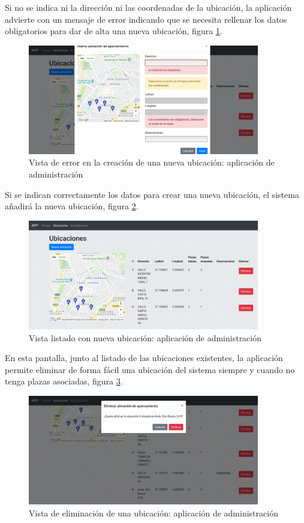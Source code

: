 Si no se indica ni la dirección ni las coordenadas de la ubicación, la aplicación advierte con un mensaje de error indicando que se necesita rellenar los datos obligatorios para dar de alta una nueva ubicación, figura \ref{administracion_ubicacion_nueva_error}.
\begin{figure}[H]
	\centering
	\includegraphics[width=0.9\textwidth]{imagenes/administracion/ubicaciones_nueva_error.png}
	\caption{Vista de error en la creación de una nueva ubicación: aplicación de administración}
	\label{administracion_ubicacion_nueva_error}
\end{figure}
Si se indican correctamente los datos para crear una nueva ubicación, el sistema añadirá la nueva ubicación, figura \ref{administracion_ubicaciones_creada}.
\begin{figure}[H]
	\centering
	\includegraphics[width=0.9\textwidth]{imagenes/administracion/ubicaciones_creada.png}
	\caption{Vista listado con nueva ubicación: aplicación de administración}
	\label{administracion_ubicaciones_creada}
\end{figure}
En esta pantalla, junto al listado de las ubicaciones existentes, la aplicación permite eliminar de forma fácil una ubicación del sistema siempre y cuando no tenga plazas asociadas, figura \ref{administracion_ubicaciones_eliminar}.
\begin{figure}[H]
	\centering
	\includegraphics[width=0.9\textwidth]{imagenes/administracion/ubicaciones_eliminar.png}
	\caption{Vista de eliminación de una ubicación: aplicación de administración}
	\label{administracion_ubicaciones_eliminar}
\end{figure}

